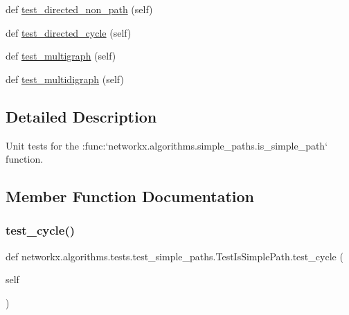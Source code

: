\begin{DoxyCompactItemize}
def \hyperlink{classnetworkx_1_1algorithms_1_1tests_1_1test__simple__paths_1_1TestIsSimplePath_a38d85d50920b87cb0d1956a210062d1e}{test\+\_\+directed\+\_\+non\+\_\+path} (self)
\item 
def \hyperlink{classnetworkx_1_1algorithms_1_1tests_1_1test__simple__paths_1_1TestIsSimplePath_acea90bfdf9c4ad765456fe9257d2acb1}{test\+\_\+directed\+\_\+cycle} (self)
\item 
def \hyperlink{classnetworkx_1_1algorithms_1_1tests_1_1test__simple__paths_1_1TestIsSimplePath_a74964f05d725caf5e3b6bffb6577f8cd}{test\+\_\+multigraph} (self)
\item 
def \hyperlink{classnetworkx_1_1algorithms_1_1tests_1_1test__simple__paths_1_1TestIsSimplePath_af47554549c57acb0c265cd225c8b2c5c}{test\+\_\+multidigraph} (self)
\end{DoxyCompactItemize}


\subsection{Detailed Description}
\begin{DoxyVerb}Unit tests for the
:func:`networkx.algorithms.simple_paths.is_simple_path` function.\end{DoxyVerb}
 

\subsection{Member Function Documentation}
\mbox{\label{classnetworkx_1_1algorithms_1_1tests_1_1test__simple__paths_1_1TestIsSimplePath_aa50505953527bf0a1c796a8dad34fb3f}} 
\subsubsection{\texorpdfstring{test\+\_\+cycle()}{test\_cycle()}}
{\footnotesize\ttfamily def networkx.\+algorithms.\+tests.\+test\+\_\+simple\+\_\+paths.\+Test\+Is\+Simple\+Path.\+test\+\_\+cycle (\begin{DoxyParamCaption}\item[{}]{self }\end{DoxyParamCaption})}


